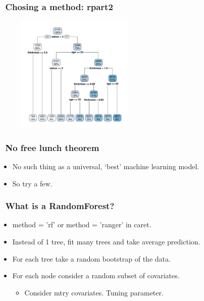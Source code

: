 \documentclass[handout, aspectratio = 169]{beamer}
\begin{document}
\begin{frame}
\frametitle{\insertframenumber~Chosing a method: rpart2}
\vspace{-4mm}
\begin{figure}
    \includegraphics[width = 0.5\textwidth]{rpart_depth6.pdf}
\end{figure} 

\end{frame} 



\begin{frame}
\frametitle{\insertframenumber~No free lunch theorem}
\begin{itemize}
\item No such thing as a universal, `best' machine learning model.
\item So try a few.
\end{itemize}

\end{frame} 



\begin{frame}
\frametitle{\insertframenumber~What is a RandomForest?}

\begin{itemize}
\item method = 'rf' or method = 'ranger' in caret.
\item Instead of 1 tree, fit many trees and take average prediction.
\item For each tree take a random bootstrap of the data.
\item For each node consider a random subset of covariates.
	\begin{itemize}
	\item Consider mtry covariates. Tuning parameter.
	\end{itemize}
\end{itemize}
\end{frame} 
\end{document}
